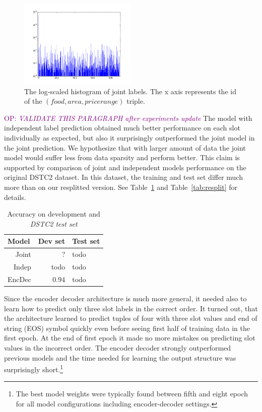 \documentclass{itatnew}
\def\OP#1{\textcolor{purple}{OP: \textit{#1}}}
\begin{document}
\begin{figure}
\includegraphics[width=0.5\textwidth]{dstc2_goals_joint_log_scale}
\caption{The log-scaled histogram of joint labels. The x axis represents the id of the $(food, area, pricerange)$ triple.}
\label{fig:labels}
\end{figure}

\OP{VALIDATE THIS PARAGRAPH after experiments update}
The model with independent label prediction obtained much better performance on each slot individually as expected, but also it surprisingly outperformed the joint model in the joint prediction.
We hypothesize that with larger amount of data the joint model would suffer less from data sparsity and perform better.
This claim is supported by comparison of joint and independent models performance on the original DSTC2 dataset.
In this dataset, the training and test set differ much more than on our resplitted version. 
See Table~\ref{tab:dstc} and Table~\ref{tab:resplit} for details.

\begin{table}
\caption{Accuracy on development and {\it DSTC2 test set }}
\begin{center}
\begin{tabular}{r@{\quad}rll}
\hline
\multicolumn{1}{l}{\rule{0pt}{12pt}
                   Model}&\multicolumn{1}{l}{Dev set}&\multicolumn{2}{l}{Test set}\\[2pt]
\hline\rule{0pt}{12pt}
Joint  &     ?&  todo \\
Indep  &   todo& todo \\
EncDec &   0.94 & todo \\
\hline
\end{tabular}
\end{center}
\label{tab:dstc}
\end{table}

Since the encoder decoder architecture is much more general, it needed also to learn how to predict only three slot labels in the correct order.
It turned out, that the architecture learned to predict tuples of four with three slot values and end of string (EOS) symbol quickly even before seeing first half of training data in the first epoch.
At the end of first epoch it made no more mistakes on predicting slot values in the incorrect order.
The encoder decoder strongly outperformed previous models and the time needed for learning the output structure was surprisingly short.\footnote{The best model weights were typically found between fifth and eight epoch for all model configurations including encoder-decoder settings.}
\end{document}
